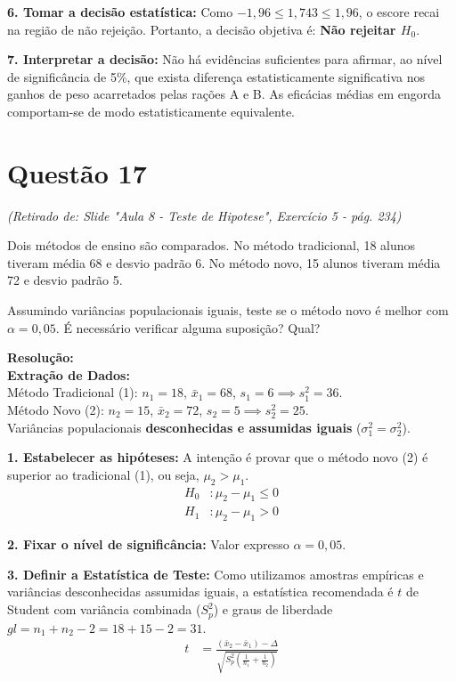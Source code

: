 \documentclass[12pt, a4paper]{article}
\begin{document}
\noindent \textbf{6. Tomar a decisão estatística:}
Como $-1{,}96 \le 1{,}743 \le 1{,}96$, o escore recai na região de não rejeição. Portanto, a decisão objetiva é: \textbf{Não rejeitar $H_0$}.

\noindent \textbf{7. Interpretar a decisão:}
Não há evidências suficientes para afirmar, ao nível de significância de 5\%, que exista diferença estatisticamente significativa nos ganhos de peso acarretados pelas rações A e B. As eficácias médias em engorda comportam-se de modo estatisticamente equivalente.

\section*{Questão 17}
\textit{(Retirado de: Slide "Aula 8 - Teste de Hipotese", Exercício 5 - pág. 234)}

Dois métodos de ensino são comparados. No método tradicional, 18 alunos tiveram média 68 e desvio padrão 6. No método novo, 15 alunos tiveram média 72 e desvio padrão 5. 

\medskip\noindent Assumindo variâncias populacionais iguais, teste se o método novo é melhor com $\alpha = 0{,}05$. É necessário verificar alguma suposição? Qual?

\vspace{0.3cm}
\noindent\textbf{Resolução:}\\
\textbf{Extração de Dados:} \\
Método Tradicional (1): $n_1 = 18$, $\bar{x}_1 = 68$, $s_1 = 6 \implies s^2_1 = 36$. \\
Método Novo (2): $n_2 = 15$, $\bar{x}_2 = 72$, $s_2 = 5 \implies s^2_2 = 25$. \\
Variâncias populacionais \textbf{desconhecidas e assumidas iguais} ($\sigma_1^2 = \sigma_2^2$).

\medskip\noindent \textbf{1. Estabelecer as hipóteses:}
A intenção é provar que o método novo (2) é superior ao tradicional (1), ou seja, $\mu_2 > \mu_1$.
\begin{align*}
H_0 &: \mu_2 - \mu_1 \le 0 \\
H_1 &: \mu_2 - \mu_1 > 0
\end{align*}

\noindent \textbf{2. Fixar o nível de significância:}
Valor expresso $\alpha = 0{,}05$.

\noindent \textbf{3. Definir a Estatística de Teste:}
Como utilizamos amostras empíricas e variâncias desconhecidas assumidas iguais, a estatística recomendada é $t$ de Student com variância combinada ($S^2_p$) e graus de liberdade $gl = n_1 + n_2 - 2 = 18 + 15 - 2 = 31$.
\begin{align*}
t &= \frac{(\bar{x}_2 - \bar{x}_1) - \Delta}{\sqrt{S^2_p \left( \frac{1}{n_1} + \frac{1}{n_2} \right)}}
\end{align*}
\end{document}
